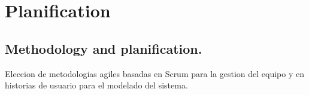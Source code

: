 \chapter{Planification}
\section{Methodology and planification.}

Eleccion de metodologias agiles basadas en Scrum para la gestion del
equipo y en historias de usuario para el modelado del sistema.
